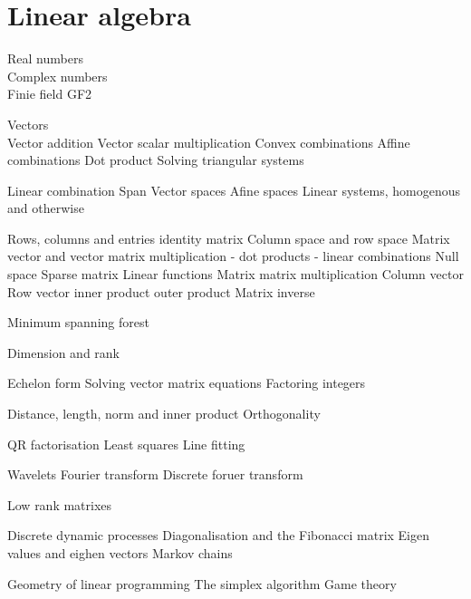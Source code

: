 \chapter{Linear algebra}

Real numbers \\
Complex numbers\\
Finie field GF2

Vectors \\
Vector addition
Vector scalar multiplication
Convex combinations
Affine combinations
Dot product 
Solving triangular systems

Linear combination
Span
Vector spaces
Afine spaces
Linear systems, homogenous and otherwise

Rows, columns and entries
identity matrix
Column space and row space
Matrix vector and vector matrix multiplication
 - dot products
 - linear combinations
Null space
Sparse matrix
Linear functions
Matrix matrix multiplication
Column vector 
Row vector
inner product 
outer product
Matrix inverse

Minimum spanning forest

Dimension and rank

Echelon form
Solving vector matrix equations
Factoring integers

Distance, length, norm and inner product
Orthogonality

QR factorisation
Least squares
Line fitting

Wavelets
Fourier transform
Discrete foruer transform

Low rank matrixes

Discrete dynamic processes
Diagonalisation and the Fibonacci matrix
Eigen values and eighen vectors
Markov chains

Geometry of linear programming
The simplex algorithm
Game theory


